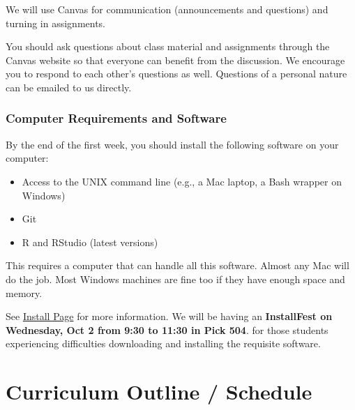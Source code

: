 \documentclass[]{book}
\providecommand{\tightlist}{%
  \setlength{\itemsep}{0pt}\setlength{\parskip}{0pt}}
\begin{document}
We will use Canvas for communication (announcements and questions) and
turning in assignments.

You should ask questions about class material and assignments through
the Canvas website so that everyone can benefit from the discussion. We
encourage you to respond to each other's questions as well. Questions of
a personal nature can be emailed to us directly.

\subsubsection*{Computer Requirements and
Software}\label{computer-requirements-and-software}

By the end of the first week, you should install the following software
on your computer:

\begin{itemize}
\tightlist
\item
  Access to the UNIX command line (e.g., a Mac laptop, a Bash wrapper on
  Windows)
\item
  Git
\item
  R and RStudio (latest versions)
\end{itemize}

This requires a computer that can handle all this software. Almost any
Mac will do the job. Most Windows machines are fine too if they have
enough space and memory.

See \href{installation}{Install Page} for more information. We will be
having an \textbf{InstallFest on Wednesday, Oct 2 from 9:30 to 11:30 in
Pick 504}. for those students experiencing difficulties downloading and
installing the requisite software.

\section{Curriculum Outline /
Schedule}\label{curriculum-outline-schedule}
\end{document}
